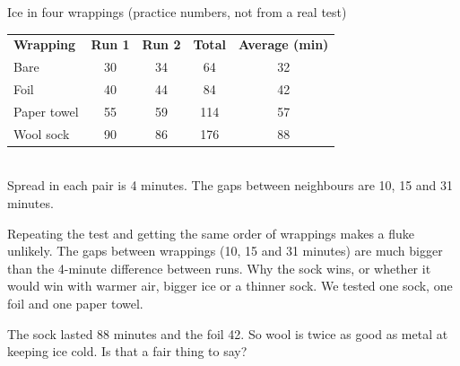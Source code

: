 \begin{worked}{Ice in four wrappings (practice numbers, not from a real test)}
\renewcommand{\arraystretch}{1.3}
\begin{tabular}{@{}lcccc@{}}
\textbf{Wrapping} & \textbf{Run 1} & \textbf{Run 2} & \textbf{Total} & \textbf{Average (min)}\\
Bare & 30 & 34 & 64 & 32\\
Foil & 40 & 44 & 84 & 42\\
Paper towel & 55 & 59 & 114 & 57\\
Wool sock & 90 & 86 & 176 & 88
\end{tabular}\\[4pt]
Spread in each pair is 4 minutes. The gaps between neighbours are 10, 15 and 31 minutes.
\end{worked}

\begin{center}
\end{center}

{Repeating the test and getting the same order of wrappings makes a fluke unlikely. The gaps between wrappings (10, 15 and 31 minutes) are much bigger than the 4-minute difference between runs.}
{Why the sock wins, or whether it would win with warmer air, bigger ice or a thinner sock. We tested one sock, one foil and one paper towel.}

\begin{multix}[hmm]\multixbot[hmm]\tcblower
The sock lasted 88 minutes and the foil 42. So wool is twice as good as metal at keeping ice cold. Is that a fair thing to say?
\end{multix}

